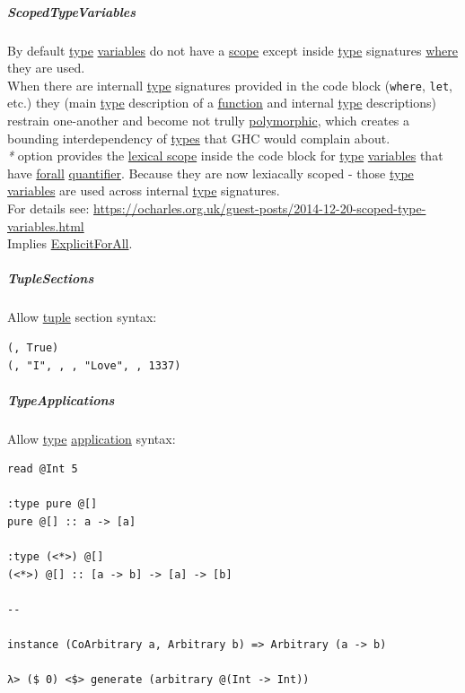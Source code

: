 \documentclass[11pt]{article}
\begin{document}
\subparagraph{\label{org98e1643}ScopedTypeVariables}
\label{sec:org355b70d}
By default \hyperref[orgc4aea2f]{type} \hyperref[orge17f54f]{variables} do not have a \hyperref[orgb3c0d1a]{scope} except inside \hyperref[orgc4aea2f]{type} signatures \hyperref[org3e5903d]{where} they are used.\\

When there are internall \hyperref[orgc4aea2f]{type} signatures provided in the code block (\texttt{where}, \texttt{let}, etc.) they (main \hyperref[orgc4aea2f]{type} description of a \hyperref[orge15bc14]{function} and internal \hyperref[orgc4aea2f]{type} descriptions) restrain one-another and become not trully \hyperref[orgac4d581]{polymorphic}, which creates a bounding interdependency of \hyperref[org4209edd]{types} that GHC would complain about.\\

\emph{*} option provides the \hyperref[org6a58f4c]{lexical scope} inside the code block for \hyperref[orgc4aea2f]{type} \hyperref[orge17f54f]{variables} that have \hyperref[orga0ddc78]{forall} \hyperref[org357bc41]{quantifier}. Because they are now lexiacally scoped - those \hyperref[orgc4aea2f]{type} \hyperref[orge17f54f]{variables} are used across internal \hyperref[orgc4aea2f]{type} signatures.\\

For details see: \url{https://ocharles.org.uk/guest-posts/2014-12-20-scoped-type-variables.html}\\

Implies \hyperref[orgebd5f50]{ExplicitForAll}.\\

\subparagraph{\label{org0213148}TupleSections}
\label{sec:orge3bc128}
Allow \hyperref[orgdf7eddf]{tuple} section syntax:\\
\begin{verbatim}
(, True)
(, "I", , , "Love", , 1337)
\end{verbatim}

\subparagraph{\label{orge6ba2f2}TypeApplications}
\label{sec:org871c37c}
Allow \hyperref[orgc4aea2f]{type} \hyperref[org2b89e66]{application} syntax:\\
\begin{verbatim}
read @Int 5

:type pure @[]
pure @[] :: a -> [a]

:type (<*>) @[]
(<*>) @[] :: [a -> b] -> [a] -> [b]

--

instance (CoArbitrary a, Arbitrary b) => Arbitrary (a -> b)

λ> ($ 0) <$> generate (arbitrary @(Int -> Int))
\end{verbatim}
\end{document}
